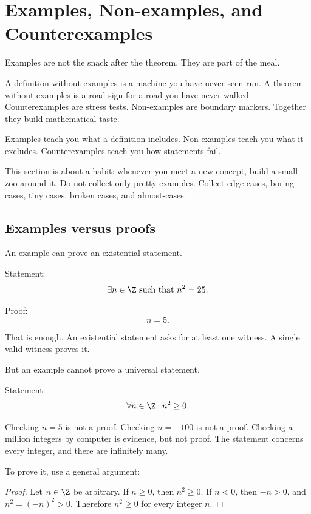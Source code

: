\newpage
\section{Examples, Non-examples, and Counterexamples}

Examples are not the snack after the theorem. They are part of the meal.

A definition without examples is a machine you have never seen run. A theorem without examples is a road sign for a road you have never walked. Counterexamples are stress tests. Non-examples are boundary markers. Together they build mathematical taste.

\begin{focusbox}
Examples teach you what a definition includes. Non-examples teach you what it excludes. Counterexamples teach you how statements fail.
\end{focusbox}

This section is about a habit: whenever you meet a new concept, build a small zoo around it. Do not collect only pretty examples. Collect edge cases, boring cases, tiny cases, broken cases, and almost-cases.

\subsection{Examples versus proofs}

An example can prove an existential statement.

Statement:
\[
\exists n\in\Z\text{ such that }n^2=25.
\]

Proof:
\[
n=5.
\]

That is enough. An existential statement asks for at least one witness. A single valid witness proves it.

But an example cannot prove a universal statement.

Statement:
\[
\forall n\in\Z,\ n^2\geq0.
\]

Checking $n=5$ is not a proof. Checking $n=-100$ is not a proof. Checking a million integers by computer is evidence, but not proof. The statement concerns every integer, and there are infinitely many.

To prove it, use a general argument:

\begin{proof}
Let $n\in\Z$ be arbitrary. If $n\geq0$, then $n^2\geq0$. If $n<0$, then $-n>0$, and $n^2=(-n)^2>0$. Therefore $n^2\geq0$ for every integer $n$.
\end{proof}

